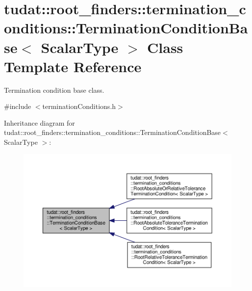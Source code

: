 \hypertarget{classtudat_1_1root__finders_1_1termination__conditions_1_1TerminationConditionBase}{}\section{tudat\+:\+:root\+\_\+finders\+:\+:termination\+\_\+conditions\+:\+:Termination\+Condition\+Base$<$ Scalar\+Type $>$ Class Template Reference}
\label{classtudat_1_1root__finders_1_1termination__conditions_1_1TerminationConditionBase}


Termination condition base class.  




{\ttfamily \#include $<$termination\+Conditions.\+h$>$}



Inheritance diagram for tudat\+:\+:root\+\_\+finders\+:\+:termination\+\_\+conditions\+:\+:Termination\+Condition\+Base$<$ Scalar\+Type $>$\+:
\nopagebreak
\begin{figure}[H]
\begin{center}
\leavevmode
\includegraphics[width=350pt]{classtudat_1_1root__finders_1_1termination__conditions_1_1TerminationConditionBase__inherit__graph}
\end{center}
\end{figure}
